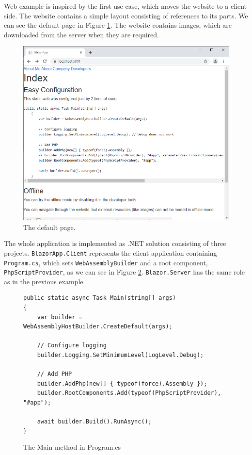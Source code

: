 Web example is inspired by the first use case, which moves the website to a client side.
The website contains a simple layout consisting of references to its parts.
We can see the default page in Figure \ref{img28:website}.
The website contains images, which are downloaded from the server when they are required.
\par
\begin{figure}[!b]\centering
\includegraphics[scale=0.5]{./img/Web}
\caption{The default page.}
\label{img28:website}
\end{figure} 
\par
The whole application is implemented as .NET solution consisting of three projects.
\texttt{BlazorApp.Client} represents the client application containing \texttt{Program.cs}, which sets \texttt{WebAssemblyBuilder} and a root component, \texttt{PhpScriptProvider}, as we can see in Figure \ref{img20:program}.
\texttt{Blazor.Server} has the same role as in the previous example.
\par
\begin{figure}
\begin{lstlisting}
public static async Task Main(string[] args)
{
	var builder = WebAssemblyHostBuilder.CreateDefault(args);

	// Configure logging
	builder.Logging.SetMinimumLevel(LogLevel.Debug);

	// Add PHP
	builder.AddPhp(new[] { typeof(force).Assembly });
	builder.RootComponents.Add(typeof(PhpScriptProvider), "#app");
            
	await builder.Build().RunAsync();
}
\end{lstlisting}
\caption{The Main method in Program.cs}
\label{img20:program}
\end{figure}
